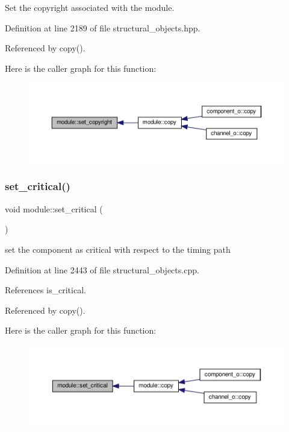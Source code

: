 Set the copyright associated with the module. 



Definition at line 2189 of file structural\+\_\+objects.\+hpp.



Referenced by copy().

Here is the caller graph for this function\+:
\nopagebreak
\begin{figure}[H]
\begin{center}
\leavevmode
\includegraphics[width=350pt]{d0/dd3/classmodule_a31b532a300bbc2b50dd505bb1cedb26e_icgraph}
\end{center}
\end{figure}
\mbox{\label{classmodule_abdba68887662602d9319be029432f5aa}} 
\subsubsection{\texorpdfstring{set\+\_\+critical()}{set\_critical()}}
{\footnotesize\ttfamily void module\+::set\+\_\+critical (\begin{DoxyParamCaption}{ }\end{DoxyParamCaption})}



set the component as critical with respect to the timing path 



Definition at line 2443 of file structural\+\_\+objects.\+cpp.



References is\+\_\+critical.



Referenced by copy().

Here is the caller graph for this function\+:
\nopagebreak
\begin{figure}[H]
\begin{center}
\leavevmode
\includegraphics[width=350pt]{d0/dd3/classmodule_abdba68887662602d9319be029432f5aa_icgraph}
\end{center}
\end{figure}
\mbox{\label{classmodule_a29539019e1f525550504d9bd24bb319e}} 
